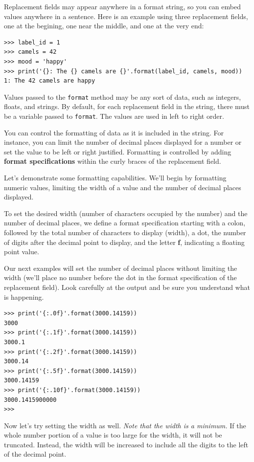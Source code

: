 Replacement fields may appear anywhere in a format string,
so you can embed values anywhere in a sentence. Here is an example using three replacement fields, one at the begining, one near the middle, and one at the very end:

\beforeverb
\begin{verbatim}
>>> label_id = 1
>>> camels = 42
>>> mood = 'happy'
>>> print('{}: The {} camels are {}'.format(label_id, camels, mood))
1: The 42 camels are happy
\end{verbatim}
\afterverb
%

Values passed to the {\tt format} method may be any sort of data, such as integers, floats, and strings. By default, for each replacement field in the string, there must be a variable passed to {\tt format}. The values are used in left to right order.

You can control the formatting of data as it is included in the string. For instance, you can limit the number of decimal places displayed for a number or set the value to be left or right justified. Formatting is controlled by adding {\bf format specifications} within the curly braces of the replacement field.

Let's demonstrate some formatting capabilities. We'll begin by formatting numeric values, limiting the width of a value and the number of decimal places displayed.

To set the desired width (number of characters occupied by the number) and the number of decimal places, we define a format specification starting with a colon, followed by the total number of characters to display (width), a dot, the number of digits after the decimal point to display, and the letter {\bf f}, indicating a floating point value.

Our next examples will set the number of decimal places without limiting the width (we'll place no number before the dot in the format specification of the replacement field). Look carefully at the output and be sure you understand what is happening.

\beforeverb
\begin{verbatim}
>>> print('{:.0f}'.format(3000.14159))
3000
>>> print('{:.1f}'.format(3000.14159))
3000.1
>>> print('{:.2f}'.format(3000.14159))
3000.14
>>> print('{:.5f}'.format(3000.14159))
3000.14159
>>> print('{:.10f}'.format(3000.14159))
3000.1415900000
>>>
\end{verbatim}
\afterverb
%
 
Now let's try setting the width as well. \emph{Note that the width is a minimum.} If the whole number portion of a value is too large for the width, it will not be truncated. Instead, the width will be increased to include all the digits to the left of the decimal point. 


